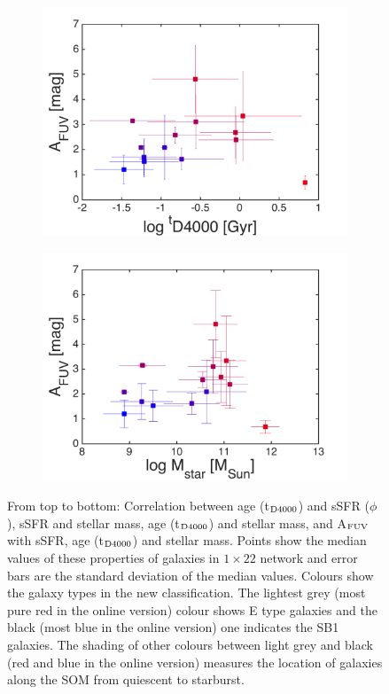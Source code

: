 \begin{figure}
\begin{subfigure}[b]{0.3\textwidth}
            \includegraphics[width=\textwidth]{images0.01/1d/f5.png}
        \end{subfigure}
       \hfill
        \begin{subfigure}[b]{0.3\textwidth}
            \includegraphics[width=\textwidth]{images0.01/1d/f6.png}
        \end{subfigure}
        \caption[Relations between properties of the clustered galaxies]{From top to bottom: Correlation between age (t$_{\rm {D4000}}$) and sSFR ($\phi$), sSFR and stellar mass, age (t$_{\rm {D4000}}$) and stellar mass, and A$_{\rm {FUV}}$ with sSFR, age (t$_{\rm {D4000}}$) and stellar mass. Points show the median values of these properties of galaxies in $1\times22$ network and error bars are the standard deviation of the median values. Colours show the galaxy types in the new classification. The lightest grey (most pure red in the online version) colour shows E type galaxies and the black (most blue in the online version) one indicates the SB1 galaxies. The shading of other colours between light grey and black (red and blue in the online version) measures the location of galaxies along the SOM from  quiescent to starburst.}
        \label{fig: props_vs_props}
    \end{figure}
    
